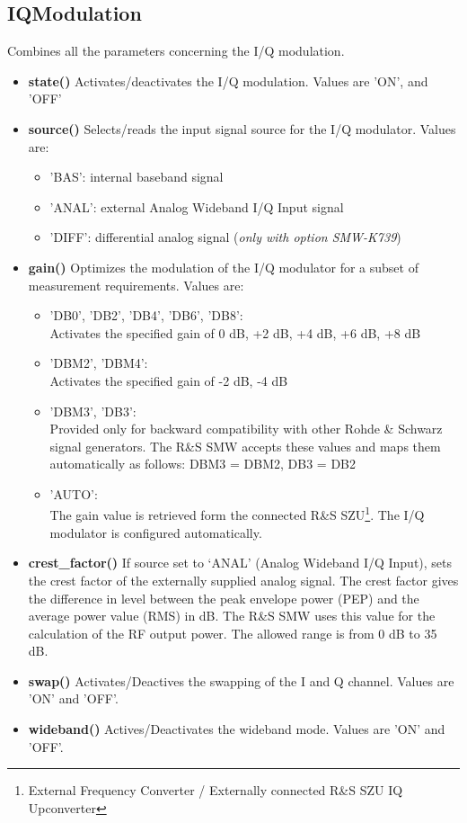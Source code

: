\documentclass[11pt]{article} %
\begin{document}
\subsection{IQModulation}

Combines all the parameters concerning the I/Q modulation.
\begin{itemize}
\item {\bf state()} Activates/deactivates the I/Q modulation. Values are 'ON', and 'OFF'
\item {\bf source()} Selects/reads the input signal source for the I/Q modulator. Values are:
	\begin{itemize}[]
	\item 'BAS': internal baseband signal
	\item 'ANAL': external Analog Wideband I/Q Input signal 
	\item 'DIFF': differential analog signal ({\it only with option SMW-K739})
	\end{itemize}
\item {\bf gain()} Optimizes the modulation of the I/Q modulator for a subset of measurement requirements. Values are:
	\begin{itemize}[]
	\item 'DB0', 'DB2', 'DB4', 'DB6', 'DB8': \\
		Activates the specified gain of 0 dB, +2 dB, +4 dB, +6 dB, +8 dB
	\item 'DBM2', 'DBM4': \\
		Activates the specified gain of -2 dB, -4 dB
	\item 'DBM3', 'DB3': \\
		Provided only for backward compatibility with other Rohde \& Schwarz signal generators. The R\&S SMW accepts these values and maps them automatically as follows: DBM3 = DBM2, DB3 = DB2
	\item 'AUTO': \\
		The gain value is retrieved form the connected R\&S SZU\footnote{External Frequency Converter / Externally connected R\&S SZU IQ Upconverter}. The I/Q modulator is configured automatically.
	\end{itemize}
\item {\bf crest\_factor()} If source set to `ANAL' (Analog Wideband I/Q Input), sets the crest factor of the externally supplied analog signal. The crest factor gives the difference in level between the peak envelope power (PEP) and the average power value (RMS) in dB. The R\&S SMW uses this value for the calculation of the RF output power. The allowed range is from 0 dB to 35 dB.
\item {\bf swap()} Activates/Deactives the swapping of the I and Q channel. Values are 'ON' and 'OFF'.
\item {\bf wideband()} Actives/Deactivates the wideband mode. Values are 'ON' and 'OFF'.
\end{itemize}
\end{document}
